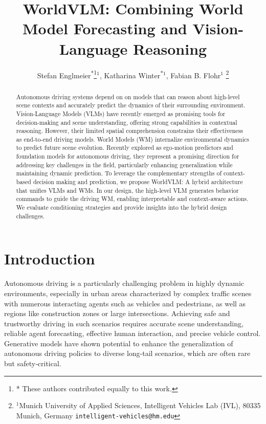 \documentclass[letterpaper, 10 pt, conference]{ieeeconf}
\begin{document}
\title{\LARGE \bf
WorldVLM: Combining World Model Forecasting and Vision-Language Reasoning
}


\author{Stefan Englmeier\textsuperscript{*}\thanks{* These authors contributed equally to this work.}$^{1}$, Katharina Winter\textsuperscript{*}$^{1}$, Fabian B. Flohr$^{1}$%
\thanks{$^{1}$Munich University of Applied Sciences, Intelligent Vehicles Lab (IVL), 80335 Munich, Germany
        {\tt\small intelligent-vehicles@hm.edu}}
}

\maketitle

\begin{abstract}
Autonomous driving systems depend on on models that can reason about high-level scene contexts and accurately predict the dynamics of their surrounding environment. Vision-Language Models (VLMs) have recently emerged as promising tools for decision-making and scene understanding, offering strong capabilities in contextual reasoning. However, their limited spatial comprehension constrains their effectiveness as end-to-end driving models. World Models (WM) internalize environmental dynamics to predict future scene evolution. Recently explored as ego-motion predictors and foundation models for autonomous driving, they represent a promising direction for addressing key challenges in the field, particularly enhancing generalization while maintaining dynamic prediction. To leverage the complementary strengths of context-based decision making and prediction, we propose WorldVLM: A hybrid architecture that unifies VLMs and WMs. In our design, the high-level VLM generates behavior commands to guide the driving WM, enabling interpretable and context-aware actions. We evaluate conditioning strategies and provide insights into the hybrid design challenges.
\end{abstract}


\section{Introduction}
Autonomous driving is a particularly challenging problem in highly dynamic environments, especially in urban areas characterized by complex traffic scenes with numerous interacting agents such as vehicles and pedestrians, as well as regions like construction zones or large intersections. Achieving safe and trustworthy driving in such scenarios requires accurate scene understanding, reliable agent forecasting, effective human interaction, and precise vehicle control.
%
Generative models have shown potential to enhance the generalization of autonomous driving policies to diverse long‑tail scenarios, which are often rare but safety‑critical. %
\end{document}

